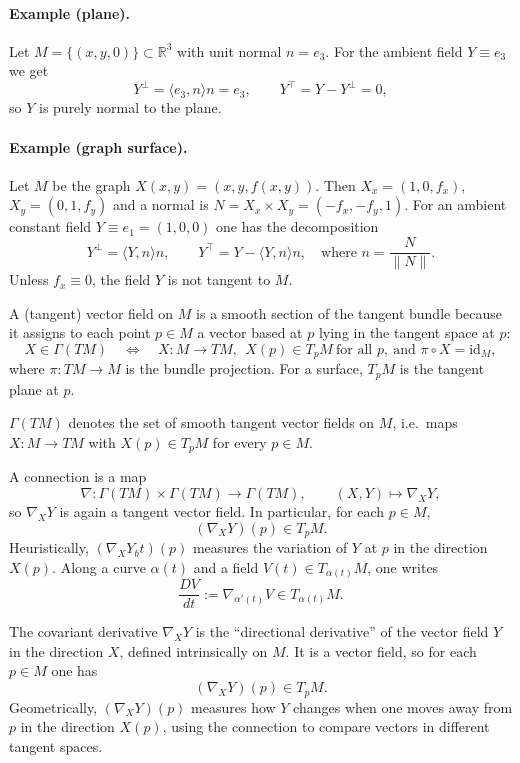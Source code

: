 \documentclass[12pt,a4paper]{article}
\theoremstyle{plain}
\theoremstyle{definition}      %
\begin{document}
	\paragraph{Example (plane).}
	Let $M=\{(x,y,0)\}\subset\mathbb{R}^3$ with unit normal $n=e_3$.
	For the ambient field $Y\equiv e_3$ we get
	\[
	Y^\perp=\langle e_3,n\rangle n=e_3,\qquad Y^\top=Y-Y^\perp=0,
	\]
	so $Y$ is purely normal to the plane.
	
	\paragraph{Example (graph surface).}
	Let $M$ be the graph $X(x,y)=(x,y,f(x,y))$. Then $X_x=(1,0,f_x)$, $X_y=(0,1,f_y)$ and a normal is
	$N=X_x\times X_y=(-f_x,-f_y,1)$.
	For an ambient constant field $Y\equiv e_1=(1,0,0)$ one has the decomposition
	\[
	Y^\perp=\langle Y,n\rangle n,\qquad Y^\top=Y-\langle Y,n\rangle n,
	\quad\text{where } n=\frac{N}{\|N\|}.
	\]
	Unless $f_x\equiv 0$, the field $Y$ is not tangent to $M$.
	
	A (tangent) vector field on $M$ is a smooth section of the tangent bundle because it assigns to each point
	$p\in M$ a vector based at $p$ lying in the tangent space at $p$:
	\[
	X\in\Gamma(TM)\quad\Longleftrightarrow\quad X:M\to TM,\ \ X(p)\in T_pM\ \text{for all }p,
	\ \text{and } \pi\circ X=\mathrm{id}_M,
	\]
	where $\pi:TM\to M$ is the bundle projection.
	For a surface, $T_pM$ is the tangent plane at $p$.
	
	
	$\Gamma(TM)$ denotes the set of smooth tangent vector fields on $M$, i.e.\ maps $X:M\to TM$ with
	$X(p)\in T_pM$ for every $p\in M$.
	
	A connection is a map
	\[
	\nabla:\Gamma(TM)\times\Gamma(TM)\to\Gamma(TM),\qquad (X,Y)\mapsto \nabla_XY,
	\]
	so $\nabla_XY$ is again a tangent vector field. In particular, for each $p\in M$,
	\[
	(\nabla_XY)(p)\in T_pM.
	\]
	Heuristically, $(\nabla_XY_bt)(p)$ measures the variation of $Y$ at $p$ in the direction $X(p)$.
	Along a curve $\alpha(t)$ and a field $V(t)\in T_{\alpha(t)}M$, one writes
	\[
	\frac{DV}{dt}:=\nabla_{\alpha'(t)}V\in T_{\alpha(t)}M.
	\]
	
	The covariant derivative $\nabla_XY$ is the ``directional derivative'' of the vector field $Y$ in the direction $X$,
	defined intrinsically on $M$. It is a vector field, so for each $p\in M$ one has
	\[
	(\nabla_XY)(p)\in T_pM.
	\]
	Geometrically, $(\nabla_XY)(p)$ measures how $Y$ changes when one moves away from $p$ in the direction $X(p)$,
	using the connection to compare vectors in different tangent spaces.
	
\end{document}
